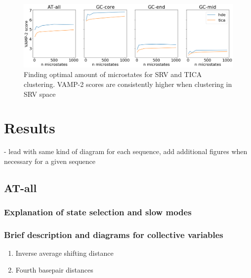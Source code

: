 \documentclass[journal=jpcbfk,manuscript=article]{achemso}
\begin{document}
\begin{figure}[ht!]
	\begin{center}
        \includegraphics[width=\textwidth]{Figs/skeleton/microstate_optimization.png}
        \caption{Finding optimal amount of microstates for SRV and TICA clustering. VAMP-2 scores are consistently higher when clustering in SRV space}
        \label{fig:sample_fray}
	\end{center}
\end{figure}


\section{\label{sec:Results}Results}
- lead with same kind of diagram for each sequence, add additional figures when necessary for a given sequence

\subsection{\label{sec:Results}AT-all}
\subsubsection{\label{sec:Results}Explanation of state selection and slow modes}
\subsubsection{\label{sec:Results}Brief description and diagrams for collective variables}
\begin{enumerate}
	\item Inverse average shifting distance
	\item Fourth basepair distances
\end{enumerate} 
\end{document}
